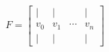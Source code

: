 \documentclass[preview]{standalone}
\begin{document}
\begin{align*}
F = \begin{bmatrix} | & | & & | \\ v_0 & v_1 & \cdots & v_n \\ | & | & & | \end{bmatrix}
\end{align*}
\end{document}
